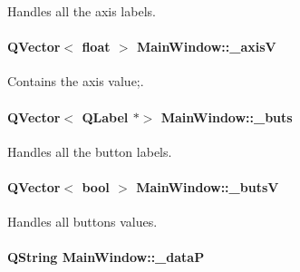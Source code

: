 Handles all the axis labels. 

\hypertarget{a00005_a20f66f574ed4c96d8dfc0013e1095f15}{}
\paragraph[{\+\_\+axis\+V}]{\setlength{\rightskip}{0pt plus 5cm}Q\+Vector$<$ float $>$ Main\+Window\+::\+\_\+axis\+V\hspace{0.3cm}{\ttfamily [private]}}\label{a00005_a20f66f574ed4c96d8dfc0013e1095f15}


Contains the axis value;. 

\hypertarget{a00005_a8eaf474e1b8672f32873ed009e28ce8a}{}
\paragraph[{\+\_\+buts}]{\setlength{\rightskip}{0pt plus 5cm}Q\+Vector$<$ Q\+Label $\ast$$>$ Main\+Window\+::\+\_\+buts\hspace{0.3cm}{\ttfamily [private]}}\label{a00005_a8eaf474e1b8672f32873ed009e28ce8a}


Handles all the button labels. 

\hypertarget{a00005_a519ae4630572cb63fbd04bce12fe8e77}{}
\paragraph[{\+\_\+buts\+V}]{\setlength{\rightskip}{0pt plus 5cm}Q\+Vector$<$ bool $>$ Main\+Window\+::\+\_\+buts\+V\hspace{0.3cm}{\ttfamily [private]}}\label{a00005_a519ae4630572cb63fbd04bce12fe8e77}


Handles all buttons values. 

\hypertarget{a00005_aaccbe653019df03668429890e325ac21}{}
\paragraph[{\+\_\+data\+P}]{\setlength{\rightskip}{0pt plus 5cm}Q\+String Main\+Window\+::\+\_\+data\+P\hspace{0.3cm}{\ttfamily [private]}}\label{a00005_aaccbe653019df03668429890e325ac21}


